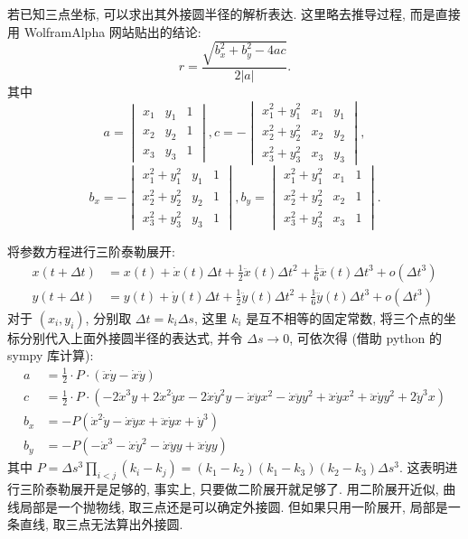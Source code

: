 若已知三点坐标, 可以求出其外接圆半径的解析表达. 这里略去推导过程, 而是直接用 WolframAlpha 网站贴出的结论:
\[r = \frac{\sqrt{b_x^2+b_y^2-4ac}}{2|a|} .\]
其中
\[
a = \begin{vmatrix}
x_1 & y_1 & 1 \\ 
x_2 & y_2 & 1 \\ 
x_3 & y_3 & 1
\end{vmatrix},  c = -\begin{vmatrix}
x_1^2 + y_1^2& x_1 & y_1 \\ 
x_2^2 + y_2^2& x_2 & y_2 \\ 
x_3^2 + y_3^2& x_3 & y_3
\end{vmatrix}, \]\[
b_x = -\begin{vmatrix}
x_1^2 + y_1^2& y_1 & 1 \\ 
x_2^2 + y_2^2& y_2 & 1 \\ 
x_3^2 + y_3^2& y_3 & 1
\end{vmatrix}, b_y = \begin{vmatrix}
x_1^2 + y_1^2& x_1 & 1 \\ 
x_2^2 + y_2^2& x_2 & 1 \\ 
x_3^2 + y_3^2& x_3 & 1
\end{vmatrix}.
\]

将参数方程进行三阶泰勒展开:
\begin{align*}
x(t+\Delta t) &= x(t) + \dot{x}(t)\Delta t + \frac{1}{2}\ddot{x}(t)\Delta t^2 + \frac{1}{6}\dddot{x}(t)\Delta t^3 + o(\Delta t^3) \\
y(t+\Delta t) &= y(t) + \dot{y}(t)\Delta t + \frac{1}{2}\ddot{y}(t)\Delta t^2 + \frac{1}{6}\dddot{y}(t)\Delta t^3 + o(\Delta t^3)
\end{align*}
对于 $(x_i, y_i)$, 分别取 $\Delta t = k_i\Delta s$, 这里 $k_i$ 是互不相等的固定常数, 将三个点的坐标分别代入上面外接圆半径的表达式, 并令 $\Delta s\to 0$, 可依次得 (借助 python 的 sympy 库计算):
\begin{align*}
a &= \frac{1}{2}\cdot P\cdot(\ddot{x}\dot{y}-\dot{x}\ddot{y}) \\
c &= \frac{1}{2}\cdot P\cdot(-2\dot{x}^3y + 2\dot{x}^2\dot{y}x - 2\dot{x}\dot{y}^2y - \dot{x}\ddot{y}x^2 - \dot{x}\ddot{y}y^2 + \ddot{x}\dot{y}x^2 + \ddot{x}\dot{y}y^2 + 2\dot{y}^3x)\\
b_x &= -P(\dot{x}^2\dot{y} - \dot{x}\ddot{y}x + \ddot{x}\dot{y}x + \dot{y}^3)\\
b_y &= -P(-\dot{x}^3 - \dot{x}\dot{y}^2 - \dot{x}\ddot{y}y + \ddot{x}\dot{y}y)
\end{align*}
其中 $\displaystyle P = \Delta s^3\prod_{i<j}(k_i - k_j) = (k_1-k_2)(k_1-k_3)(k_2-k_3)\Delta s^3$. 这表明进行三阶泰勒展开是足够的, 事实上, 只要做二阶展开就足够了. 用二阶展开近似, 曲线局部是一个抛物线, 取三点还是可以确定外接圆. 但如果只用一阶展开, 局部是一条直线, 取三点无法算出外接圆.

